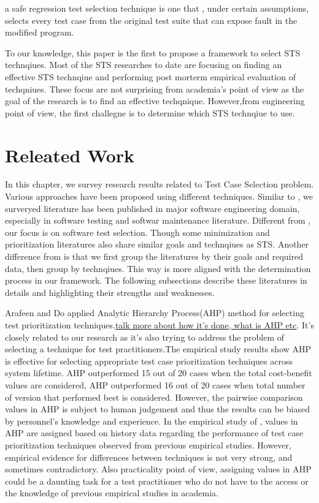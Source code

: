 a safe regression test selection technique is one that , under certain
assumptions, selects every test case from the original test suite that can
expose fault in the modified program.\cite{DBLP:journals/tse/RothermelH96}

To our knowledge, this paper is the first to propose a framework to select STS
technqiues. Most of the STS researches to date are focusing on
finding an effective STS technqiue and performing post morterm empirical
evaluation of techqniues. These focus are not surprising from academia's point of
view as the goal of the research is to find an effective techqnique.
However,from engineering point of view, the first challegne is to determine
which STS technqiue to use. 

\chapter{Releated Work}\label{ch:related-work}
In this chapter, we survey research results related to Test Case Selection
problem. Various approaches have been proposed using different
techniques. Similar to \cite{Yoo:2010}, we surveryed literature has been
published in major software engineering domain, especially in software testing and softwar
maintenance literature. Different from \cite{Yoo:2010}, our focus is on software
test selection. Though some minimization and prioritization literatures also share
similar goals and technqiues as STS. Another difference from \cite{Yoo:2010}is
that we first group the literatures by their goals and required data, then group by
technqiues. This way is more aligned with the determination process in our
framework. The following subsections describe these literatures in details and
highlighting their strengths and weaknesses.

Arafeen and Do\cite{DBLP:conf/issre/ArafeenD11} applied Analytic Hierarchy
Process(AHP) method for selecting test prioritization
techniques.\underline{talk more about how it's done, what is AHP etc}. It's
closely related to our research as it's also trying to address the problem of selecting a technique for test practitioners.The empirical study results show AHP is effective for
selecting appropriate test case prioritization techniques across
system lifetime. AHP outperformed 15 out of 20 cases when the total cost-benefit
values are considered, AHP outperformed 16 out of 20 cases when total number of version that performed best is considered.
However, the pairwise comparison values in AHP is subject to human judgement
and thus the results can be biased by personnel's knowledge and experience.
In the empirical study of \cite{DBLP:conf/issre/ArafeenD11}, values in AHP are
assigned based on history data regarding the performance of test case prioritization techniques observed
from previous empirical studies. However, empirical evidence for differences
between techniques is not very strong, and sometimes contradictory\cite{}. Also
practicality point of view,  assigning values in AHP could be a daunting task
for a test practitioner who do not have to the access or the knowledge of
previous empirical studies in academia. 

